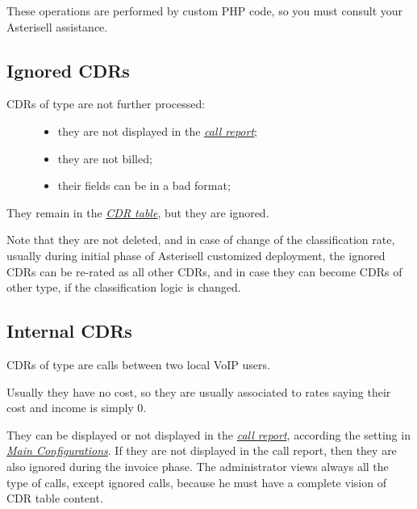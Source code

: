 \documentclass[letterpaper,10pt,english]{sphinxmanual}
\begin{document}
These operations are performed by custom PHP code, so you must consult your Asterisell assistance.


\subsection{Ignored CDRs}
\label{index:ignored-cdrs}\begin{description}
\item[{CDRs of type  are not further processed:}] \leavevmode\begin{itemize}
\item {} 
they are not displayed in the {\hyperref[index:term-call-report]{\emph{call report}}};

\item {} 
they are not billed;

\item {} 
their fields can be in a bad format;

\end{itemize}

\end{description}

They remain in the {\hyperref[index:term-cdr-table]{\emph{CDR table}}}, but they are ignored.

Note that they are not deleted, and in case of change of the classification rate, usually during initial phase of Asterisell customized deployment, the ignored CDRs can be re-rated as all other CDRs, and in case they can become CDRs of other type, if the classification logic is changed.


\subsection{Internal CDRs}
\label{index:internal-cdrs}
CDRs of type  are calls between two local VoIP users.

Usually they have no cost, so they are usually associated to rates saying their cost and income is simply 0.

They can be displayed or not displayed in the {\hyperref[index:term-call-report]{\emph{call report}}}, according the setting  in {\hyperref[index:main-configurations]{\emph{Main Configurations}}}. If they are not displayed in the call report, then they are also ignored during the invoice phase. The administrator views always all the type of calls, except ignored calls, because he must have a complete vision of CDR table content.
\end{document}
